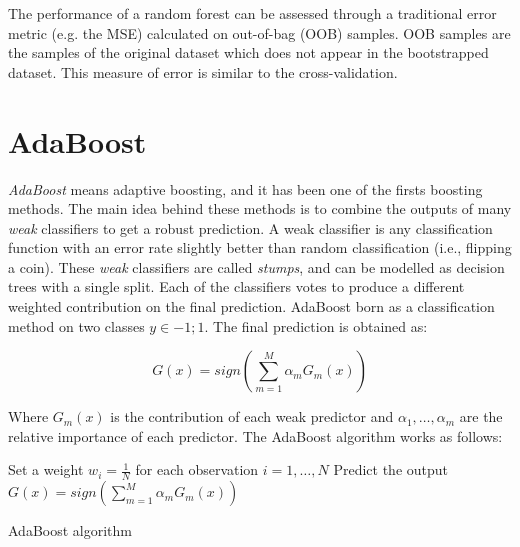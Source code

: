 The performance of a random forest can be assessed through a traditional error metric (e.g. the MSE) calculated on out-of-bag (OOB) samples. OOB samples are the samples of the original dataset which does not appear in the bootstrapped dataset. This measure of error is similar to the cross-validation.

\section{AdaBoost}
\textit{AdaBoost} means adaptive boosting, and it has been one of the firsts boosting methods. The main idea behind these methods is to combine the outputs of many \textit{weak} classifiers to get a robust prediction. A weak classifier is any classification function with an error rate slightly better than random classification (i.e., flipping a coin). These \textit{weak} classifiers are called \textit{stumps}, and can be modelled as decision trees with a single split. Each of the classifiers votes to produce a different weighted contribution on the final prediction. AdaBoost born as a classification method on two classes $y\in{-1;1}$. The final prediction is obtained as:

\begin{equation}
G\left(x\right)=sign\left(\sum_{m=1}^{M}{\alpha_mG_m\left(x\right)}\right)
\label{eq_adaboost}
\end{equation}

Where $G_m(x)$ is the contribution of each weak predictor and $\alpha_1,\ldots,\alpha_m$ are the relative importance of each predictor. The AdaBoost algorithm works as follows:

\begin{algorithm}[H]
\DontPrintSemicolon
\SetAlgoLined

	Set a weight $w_i=\frac{1}{N}$ for each observation $i=1,\ldots,N$ \;
	Predict the output $G\left(x\right)=sign\left(\sum_{m=1}^{M}{\alpha_mG_m\left(x\right)}\right)$ \; 


\caption{AdaBoost algorithm}
\label{algo_adaboost}
\end{algorithm}

